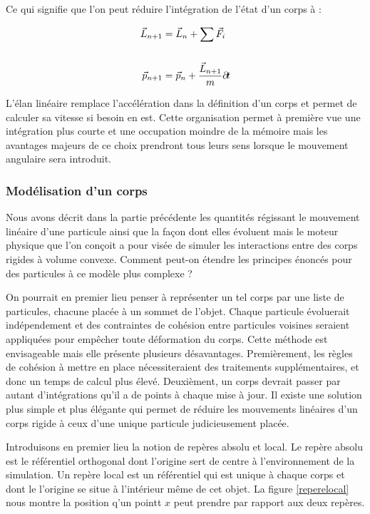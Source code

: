 Ce qui signifie que l'on peut réduire l'intégration de l'état d'un
corps à :

\begin{align*}
  \vec{L}_{n+1} &= \vec{L}_n + {\sum \vec{F}_i} \\ \\
  \vec{p}_{n+1} &= \vec{p}_n + \frac{\vec{L}_{n+1}}{m} \partial \! t \\
\end{align*}

L'élan linéaire remplace l'accélération dans la définition d'un corps
et permet de calculer sa vitesse si besoin en est. Cette organisation
permet à première vue une intégration plus courte et une occupation
moindre de la mémoire mais les avantages majeurs de ce choix prendront
tous leurs sens lorsque le mouvement angulaire sera introduit.

\subsubsection{Modélisation d'un corps}

Nous avons décrit dans la partie précédente les quantités régissant le
mouvement linéaire d'une particule ainsi que la façon dont elles
évoluent mais le moteur physique que l'on conçoit a pour visée de
simuler les interactions entre des corps rigides à volume
convexe. Comment peut-on étendre les principes énoncés pour des
particules à ce modèle plus complexe ?

On pourrait en premier lieu penser à représenter un tel corps par une
liste de particules, chacune placée à un sommet de l'objet. Chaque
particule évoluerait indépendement et des contraintes de cohésion
entre particules voisines seraient appliquées pour empêcher toute
déformation du corps. Cette méthode est envisageable mais elle
présente plusieurs désavantages. Premièrement, les règles de cohésion
à mettre en place nécessiteraient des traitements supplémentaires, et
donc un temps de calcul plus élevé. Deuxièment, un corps devrait
passer par autant d'intégrations qu'il a de points à chaque mise à
jour. Il existe une solution plus simple et plus élégante qui permet
de réduire les mouvements linéaires d'un corps rigide à ceux d'une
unique particule judicieusement placée.

Introduisons en premier lieu la notion de repères absolu et local. Le
repère absolu est le référentiel orthogonal dont l'origine sert de
centre à l'environnement de la simulation. Un repère local est un
référentiel qui est unique à chaque corps et dont le l'origine se
situe à l'intérieur même de cet objet. La figure \ref{reperelocal}
nous montre la position q'un pointt $x$ peut prendre par rapport aux
deux repères.

